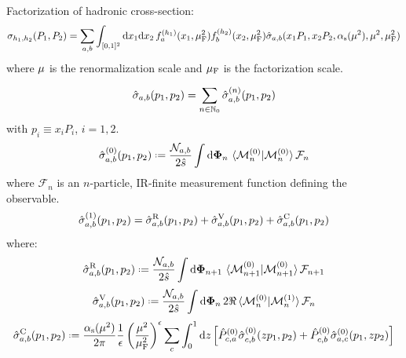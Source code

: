 
Factorization of hadronic cross-section:
\begin{equation*}
  \sigma_{h_1 , h_2}(P_1 , P_2) = \sum_{a,b} \int_{[0,1]^2} \mathrm{d} x_1 \mathrm{d} x_2 \, f_a^{(h_1)}(x_1, \mu_\text{F}^2) f_b^{(h_2)}(x_2, \mu_\text{F}^2) \hat{\sigma}_{a,b}(x_1 P_1, x_2 P_2, \alpha_\text{s}(\mu^2), \mu^2, \mu_\text{F}^2)
\end{equation*}
where $ \mu $ is the renormalization scale and $ \mu_\text{F} $ is the factorization scale.

\begin{equation}
  \hat{\sigma}_{a,b}(p_1 , p_2) = \sum_{n \in \mathbb{N}_0} \hat{\sigma}_{a,b}^{(n)}(p_1 , p_2)
\end{equation}
with $ p_i \equiv x_i P_i $, $ i = 1,2 $.
\begin{equation}
  \pcs_{a,b}^{(0)}(p_1 , p_2) \defeq \frac{\mathcal{N}_{a,b}}{2\hat{s}} \int \lps_n \, \braket{\me_n^{(0)} | \me_n^{(0)}} \mathcal{F}_n
\end{equation}
where $ \mathcal{F}_n $ is an $ n $-particle, IR-finite measurement function defining the observable.
\begin{equation}
  \hat{\sigma}_{a,b}^{(1)}(p_1 , p_2) = \hat{\sigma}_{a,b}^\text{R}(p_1 , p_2) + \hat{\sigma}_{a,b}^\text{V}(p_1 , p_2) + \hat{\sigma}_{a,b}^\text{C}(p_1 , p_2)
\end{equation}
where:
\begin{equation}
  \pcs_{a,b}^\text{R}(p_1 , p_2) \defeq \frac{\mathcal{N}_{a,b}}{2\hat{s}} \int \lps_{n+1} \, \braket{\me_{n+1}^{(0)} | \me_{n+1}^{(0)}} \mathcal{F}_{n+1}
\end{equation}
\begin{equation}
  \pcs_{a,b}^\text{V}(p_1 , p_2) \defeq \frac{\mathcal{N}_{a,b}}{2\hat{s}} \int \lps_n \, 2\Re \braket{\me_n^{(0)} | \me_n^{(1)}} \mathcal{F}_n
\end{equation}
\begin{equation}
  \pcs_{a,b}^\text{C}(p_1 , p_2) \defeq \frac{\rc(\ren^2)}{2\pi} \frac{1}{\de} \left( \frac{\ren^2}{\fac^2} \right)^\de \sum_c \int_0^1 \dd z \left[ \hat{P}_{c,a}^{(0)} \pcs_{c,b}^{(0)}(z p_1 , p_2) + \hat{P}_{c,b}^{(0)} \pcs_{a,c}^{(0)}(p_1 , z p_2) \right]
\end{equation}
